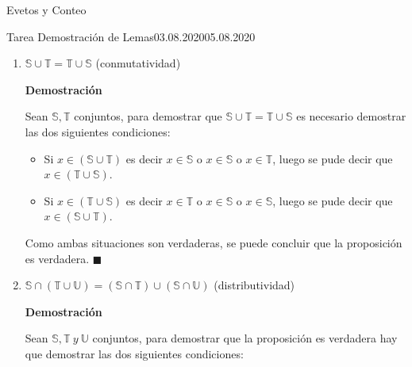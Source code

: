 \documentclass[a4paper]{book}
\begin{document}
\begin{chapter}{Evetos y Conteo}
\begin{tarea}{Tarea Demostración de Lemas}{03.08.2020}{05.08.2020}
            \begin{enumerate}

                \item $\mathbb S\cup \mathbb T= \mathbb T\cup \mathbb S$
                    (conmutatividad)

                    \textbf{Demostración}

                    Sean $\mathbb S,\mathbb T$ conjuntos, para demostrar que
                    $\mathbb S\cup \mathbb T= \mathbb T\cup \mathbb S$ es
                    necesario demostrar las dos siguientes condiciones:

                    \begin{itemize}
                        \item Si $x\in(\mathbb S\cup \mathbb T)$ es decir $x\in
                            \mathbb S$ o $x\in \mathbb S$ o $x\in \mathbb T$,
                            luego se pude decir que $x\in(\mathbb T\cup \mathbb
                            S)$.

                        \item Si $x\in(\mathbb T\cup \mathbb S)$ es decir $x\in
                            \mathbb T$ o $x\in \mathbb S$ o $x\in \mathbb S$,
                            luego se pude decir que $x\in(\mathbb S\cup \mathbb
                            T)$.
                    \end{itemize}

                    Como ambas situaciones son verdaderas, se puede concluir
                    que la proposición es verdadera. $\blacksquare$


                \item $\mathbb S\cap(\mathbb T\cup \mathbb U)=(\mathbb S\cap
                    \mathbb T)\cup(\mathbb S\cap \mathbb U)$ (distributividad)

                    \textbf{Demostración}

                    Sean $\mathbb S, \mathbb T\ y\ \mathbb U$ conjuntos, para
                    demostrar que la proposición es verdadera hay que demostrar
                    las dos siguientes condiciones:


\end{enumerate}
\end{tarea}
\end{chapter}
\end{document}
